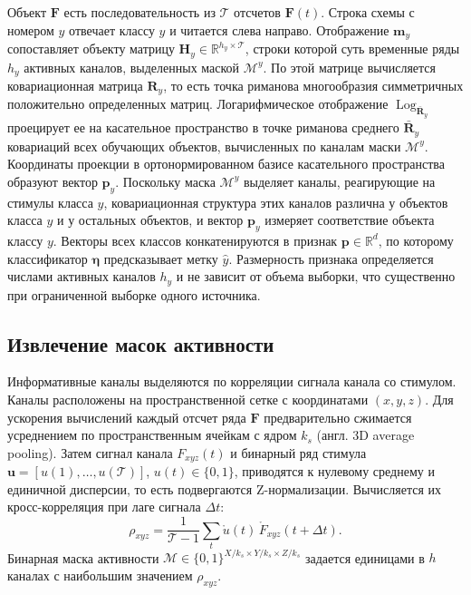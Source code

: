 Объект $\mathbf{F}$ есть последовательность из $\mathcal{T}$ отсчетов $\mathbf{F}(t)$. Строка схемы с номером $y$ отвечает классу $y$ и читается слева направо. Отображение $\mathbf{m}_y$ сопоставляет объекту матрицу $\mathbf{H}_y \in \mathbb{R}^{h_y \times \mathcal{T}}$, строки которой суть временные ряды $h_y$ активных каналов, выделенных маской $\mathcal{M}^{y}$. По этой матрице вычисляется ковариационная матрица $\mathbf{R}_y$, то есть точка риманова многообразия симметричных положительно определенных матриц. Логарифмическое отображение $\operatorname{Log}_{\bar{\mathbf{R}}_y}$ проецирует ее на касательное пространство в точке риманова среднего $\bar{\mathbf{R}}_y$ ковариаций всех обучающих объектов, вычисленных по каналам маски $\mathcal{M}^{y}$. Координаты проекции в ортонормированном базисе касательного пространства образуют вектор $\mathbf{p}_y$. Поскольку маска $\mathcal{M}^{y}$ выделяет каналы, реагирующие на стимулы класса $y$, ковариационная структура этих каналов различна у объектов класса $y$ и у остальных объектов, и вектор $\mathbf{p}_y$ измеряет соответствие объекта классу $y$. Векторы всех классов конкатенируются в признак $\mathbf{p} \in \mathbb{R}^{d}$, по которому классификатор $\boldsymbol{\eta}$ предсказывает метку $\hat{y}$. Размерность признака определяется числами активных каналов $h_y$ и не зависит от объема выборки, что существенно при ограниченной выборке одного источника.

\subsection{Извлечение масок активности}\label{sec3:cls_mask}
Информативные каналы выделяются по корреляции сигнала канала со стимулом. Каналы расположены на пространственной сетке с координатами $(x, y, z)$. Для ускорения вычислений каждый отсчет ряда $\mathbf{F}$ предварительно сжимается усреднением по пространственным ячейкам с ядром $k_s$ (англ. 3D average pooling). Затем сигнал канала $F_{xyz}(t)$ и бинарный ряд стимула $\mathbf{u} = [u(1), \ldots, u(\mathcal{T})]$, $u(t)\in\{0,1\}$, приводятся к нулевому среднему и единичной дисперсии, то есть подвергаются Z-нормализации. Вычисляется их кросс-корреляция при лаге сигнала $\Delta t$:
\begin{equation}\label{eq:cls_corr}
\rho_{xyz} = \frac{1}{\mathcal{T}-1} \sum_{t} \mathring{u}(t)\, \mathring{F}_{xyz}(t + \Delta t).
\end{equation}
Бинарная маска активности $\mathcal{M} \in \{0,1\}^{X/k_s \times Y/k_s \times Z/k_s}$ задается единицами в $h$ каналах с наибольшим значением $\rho_{xyz}$.

